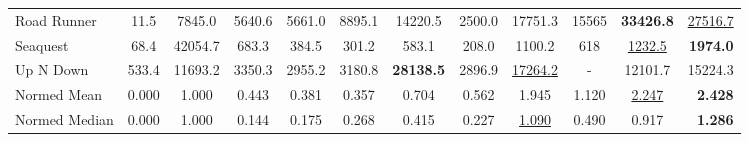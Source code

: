 \begin{table*}[ht]
\begin{center}
\begin{small}
{\begin{tabular}{lccccccccccr}
Road Runner         &     11.5 &   7845.0 &   5640.6 &  5661.0 &   8895.1 & 14220.5 & 2500.0 & 17751.3 & 15565 & \textbf{33426.8} & \underline{27516.7} \\
Seaquest            &     68.4 &  42054.7 &    683.3 &   384.5 &    301.2 &   583.1 & 208.0 & 1100.2 & 618 & \underline{1232.5} & \textbf{1974.0} \\
Up N Down           &    533.4 &  11693.2 &   3350.3 &  2955.2 &   3180.8 & \textbf{28138.5} & 2896.9 & \underline{17264.2} & - & 12101.7 & 15224.3 \\
\midrule
Normed Mean         &    0.000 &    1.000 &    0.443 &    0.381 &    0.357 &   0.704 & 0.562 & 1.945 & 1.120 & \underline{2.247} & \textbf{2.428} \\
Normed Median       &    0.000 &    1.000 &    0.144 &    0.175 &    0.268 &   0.415 & 0.227 & \underline{1.090} & 0.490 & 0.917 & \textbf{1.286} \\
\bottomrule
\end{tabular}
}
\end{small}
\end{center}
\end{table*}